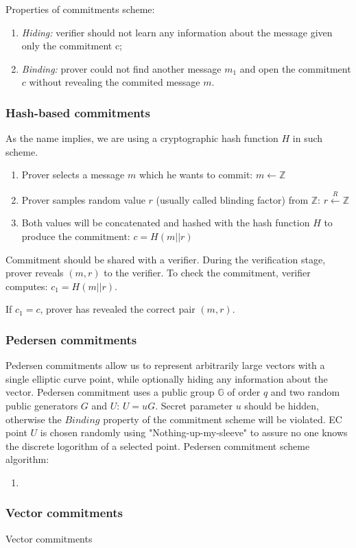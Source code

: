 \documentclass[../lecture-notes.tex]{subfiles}
\begin{document}
Properties of commitments scheme:
\begin{enumerate}
    \item \textit{Hiding: } verifier should not learn any information about the message given only the commitment c;
    \item \textit{Binding: } prover could not find another message $m_1$ and open the commitment $c$ without revealing the commited message $m$.
\end{enumerate}

\subsubsection{Hash-based commitments}

As the name implies, we are using a cryptographic hash function \(H\) in such scheme.

\begin{enumerate}
    \item Prover selects a message $m$ which he wants to commit:
        $m \leftarrow \mathbb{Z}$

    \item Prover samples random value $r$ (usually called blinding factor) from $\mathbb{Z}$:
        $r \xleftarrow{R} \mathbb{Z}$
    
    \item Both values will be concatenated and hashed with the hash function $H$ to produce the commitment:
        $c = H(m || r)$

\end{enumerate}

Commitment should be shared with a verifier. During the verification stage, prover reveals $(m, r)$ to the verifier. 
To check the commitment, verifier computes: $c_1 = H(m || r)$.

If $c_1 = c$, prover has revealed the correct pair $(m, r)$.

\subsubsection{Pedersen commitments}

Pedersen commitments allow us to represent arbitrarily large vectors with a single elliptic curve point, while optionally hiding any information about the vector. Pedersen commitment uses a public group $\mathbb{G}$ of order $q$ and two random public generators $G$ and $U$: $U = uG$. Secret parameter $u$ should be hidden, otherwise the $\textit{Binding}$ property of the commitment scheme will be violated.
EC point $U$ is chosen randomly using "Nothing-up-my-sleeve" to assure no one knows the discrete logorithm of a selected point.
Pedersen commitment scheme algorithm:
\begin{enumerate}
    \item 
\end{enumerate}


\subsubsection{Vector commitments}

Vector commitments
\end{document}
